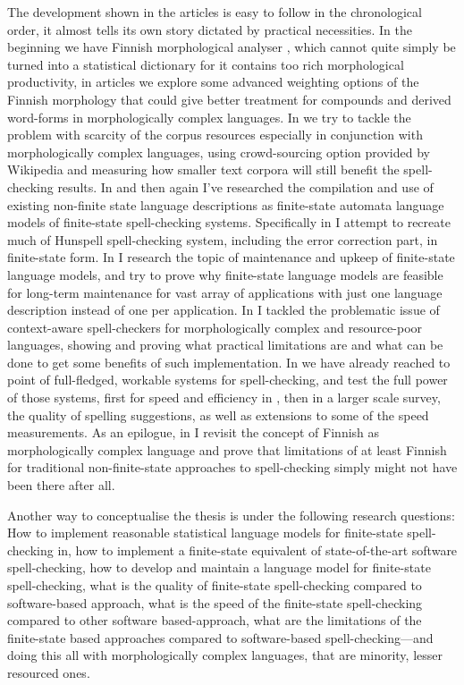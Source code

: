 \documentclass[officiallayout,draft]{unihelcompling}
\begin{document}
The development shown in the articles is easy to follow in the chronological
order, it almost tells its own story dictated by practical necessities. In the
beginning we have Finnish morphological analyser \cite{pirinen2008suomen},
which cannot quite simply be turned into a statistical dictionary for it
contains too rich morphological productivity, in articles
\cite{pirinen2009weighted,pirinen2009weighting} we explore some advanced
weighting options of the Finnish morphology that could give better treatment
for compounds and derived word-forms in morphologically complex languages. In
\cite{pirinen2010finitestate} we try to tackle the problem with scarcity of the
corpus resources especially in conjunction with morphologically complex
languages, using crowd-sourcing option provided by Wikipedia and measuring how
smaller text corpora will still benefit the spell-checking results. In
\cite{pirinen2010building,pirinen2010creating} and then again
\cite{pirinen2012compiling} I've researched the compilation and use of existing
non-finite state language descriptions as finite-state automata language models
of finite-state spell-checking systems. Specifically in
\cite{pirinen2010creating} I attempt to recreate much of Hunspell
spell-checking system, including the error correction part, in finite-state
form. In \cite{pirinen2011modularisation} I research the topic of maintenance
and upkeep of finite-state language models, and try to prove why finite-state
language models are feasible for long-term maintenance for vast array of
applications with just one language description instead of one per application.
In \cite{pirinen2012improving} I tackled the problematic issue of context-aware
spell-checkers for morphologically complex and resource-poor languages, showing
and proving what practical limitations are and what can be done to get some
benefits of such implementation. In
\cite{pirinen2012effects,pirinen2013weighting} we have already reached to point
of full-fledged, workable systems for spell-checking, and test the full power
of those systems, first for speed and efficiency in \cite{pirinen2012effects},
then in a larger scale survey, the quality of spelling suggestions, as well as
extensions to some of the speed measurements. As an epilogue, in
\cite{pirinen2013finnish} I revisit the concept of Finnish as morphologically
complex language and prove that limitations of at least Finnish for traditional
non-finite-state approaches to spell-checking simply might not have been there
after all.

Another way to conceptualise the thesis is under the following research
questions: How to implement reasonable statistical language models for
finite-state spell-checking in, how to implement a finite-state equivalent of
state-of-the-art software spell-checking, how to develop and maintain a
language model for finite-state spell-checking, what is the quality of
finite-state spell-checking compared to software-based approach, what is the
speed of the finite-state spell-checking compared to other software
based-approach, what are the limitations of the finite-state based approaches
compared to software-based spell-checking---and doing this all with
morphologically complex languages, that are minority, lesser resourced ones.
\end{document}

